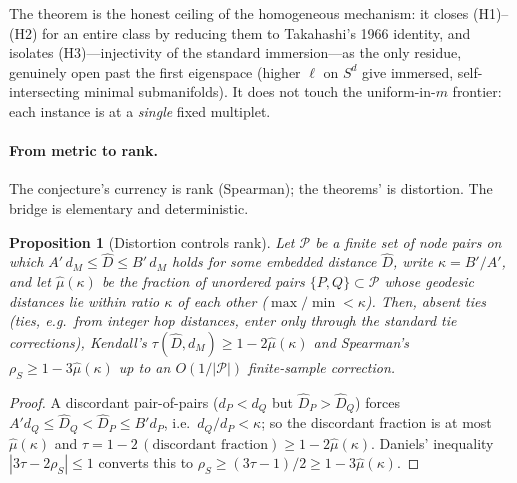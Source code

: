 \documentclass[11pt]{article}
\newtheorem{proposition}[theorem]{Proposition}
\theoremstyle{remark}
\begin{document}
\noindent The theorem is the honest ceiling of the homogeneous mechanism: it
closes (H1)--(H2) for an entire class by reducing them to Takahashi's 1966
identity, and isolates (H3)---injectivity of the standard immersion---as the only
residue, genuinely open past the first eigenspace (higher $\ell$ on $S^d$ give
immersed, self-intersecting minimal submanifolds). It does not touch the
uniform-in-$m$ frontier: each instance is at a \emph{single} fixed multiplet.

\paragraph{From metric to rank.} The conjecture's currency is rank
(Spearman); the theorems' is distortion. The bridge is elementary and
deterministic.

\begin{proposition}[Distortion controls rank]\label{prop:rank}
Let $\mathcal P$ be a finite set of node pairs on which
$A'\,d_M\le\widehat D\le B'\,d_M$ holds for some embedded distance
$\widehat D$, write $\kappa=B'/A'$, and let $\hat\mu(\kappa)$ be the fraction
of unordered pairs $\{P,Q\}\subset\mathcal P$ whose geodesic distances lie
within ratio $\kappa$ of each other ($\max/\min<\kappa$). Then, absent ties
(ties, e.g.\ from integer hop distances, enter only through the standard tie
corrections), Kendall's $\tau(\widehat D,d_M)\ge1-2\hat\mu(\kappa)$ and
Spearman's $\rho_S\ge1-3\hat\mu(\kappa)$ up to an $O(1/|\mathcal P|)$
finite-sample correction.
\end{proposition}
\begin{proof}
A discordant pair-of-pairs ($d_P<d_Q$ but $\widehat D_P>\widehat D_Q$)
forces $A'd_Q\le\widehat D_Q<\widehat D_P\le B'd_P$, i.e.\ $d_Q/d_P<\kappa$;
so the discordant fraction is at most $\hat\mu(\kappa)$ and
$\tau=1-2\,(\text{discordant fraction})\ge1-2\hat\mu(\kappa)$. Daniels'
inequality $|3\tau-2\rho_S|\le1$ \cite{daniels1950} converts this to
$\rho_S\ge(3\tau-1)/2\ge1-3\hat\mu(\kappa)$.
\end{proof}
\end{document}
